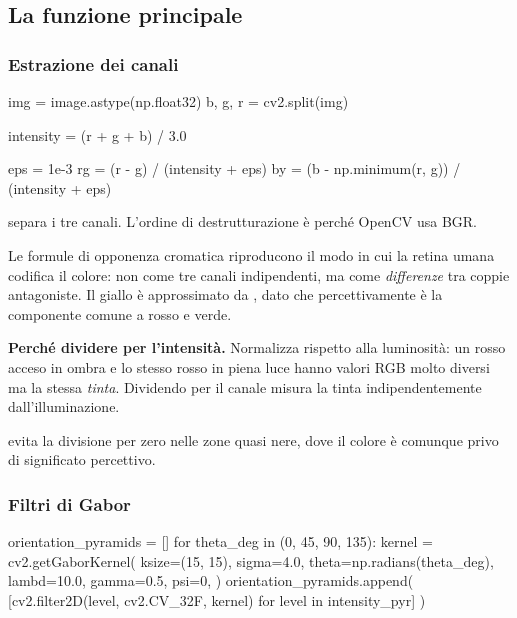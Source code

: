 \subsection{La funzione principale}

\subsubsection{Estrazione dei canali}

\begin{idebox}
\begin{pycode}
img = image.astype(np.float32)
b, g, r = cv2.split(img)

intensity = (r + g + b) / 3.0

eps = 1e-3
rg = (r - g) / (intensity + eps)
by = (b - np.minimum(r, g)) / (intensity + eps)
\end{pycode}
\end{idebox}

 separa i tre canali. L'ordine di destrutturazione è  perché
OpenCV usa BGR.

Le formule di opponenza cromatica riproducono il modo in cui la retina umana codifica il colore:
non come tre canali indipendenti, ma come \emph{differenze} tra coppie antagoniste. Il giallo è
approssimato da , dato che percettivamente è la componente comune a rosso
e verde.

\begin{nota}
\textbf{Perché dividere per l'intensità.} Normalizza rispetto alla luminosità: un rosso acceso in
ombra e lo stesso rosso in piena luce hanno valori RGB molto diversi ma la stessa \emph{tinta}.
Dividendo per  il canale misura la tinta indipendentemente dall'illuminazione.

\medskip
{} evita la divisione per zero nelle zone quasi nere, dove il colore è comunque
privo di significato percettivo.
\end{nota}

\subsubsection{Filtri di Gabor}

\begin{idebox}
\begin{pycode}
orientation_pyramids = []
for theta_deg in (0, 45, 90, 135):
    kernel = cv2.getGaborKernel(
        ksize=(15, 15), sigma=4.0, theta=np.radians(theta_deg),
        lambd=10.0, gamma=0.5, psi=0,
    )
    orientation_pyramids.append(
        [cv2.filter2D(level, cv2.CV_32F, kernel) for level in intensity_pyr]
    )
\end{pycode}
\end{idebox}

